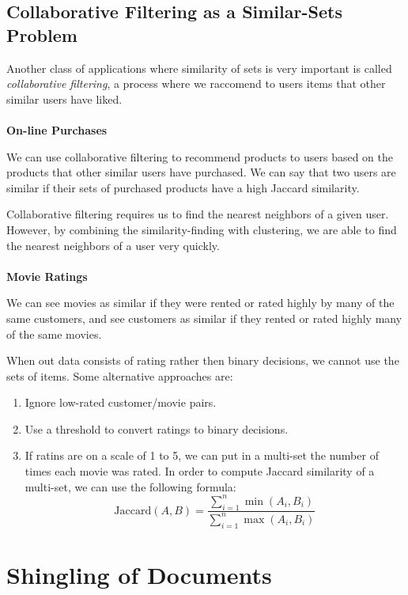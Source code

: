 \subsection{Collaborative Filtering as a Similar-Sets Problem}\label{subsec:collaborative-filtering-as-a-similar-sets-problem}

Another class of applications where similarity of sets is very important is called \textit{collaborative filtering}, a process where we raccomend to users items that other similar users have liked. 
\\
\\
\noindent \textbf{On-line Purchases} 

\noindent We can use collaborative filtering to recommend products to users based on the products that other similar users have purchased. We can say that two users are similar if their sets of purchased products have a high Jaccard similarity. 

Collaborative filtering requires us to find the nearest neighbors of a given user. However, by combining the similarity-finding with clustering, we are able to find the nearest neighbors of a user very quickly.
\\
\\
\noindent \textbf{Movie Ratings}

\noindent We can see movies as similar if they were rented or rated highly by many of the same customers, and see customers as similar if they rented or rated highly many of the same movies. 

When out data consists of rating rather then binary decisions, we cannot use the sets of items. Some alternative approaches are:

\begin{enumerate}
    \item Ignore low-rated customer/movie pairs.
    \item Use a threshold to convert ratings to binary decisions.
    \item If ratins are on a scale of 1 to 5, we can put in a multi-set the number of times each movie was rated. In order to compute Jaccard similarity of a multi-set, we can use the following formula:
    \begin{equation*}
        \text{Jaccard}(A, B) = \frac{\sum_{i=1}^n \min(A_i, B_i)}{\sum_{i=1}^n \max(A_i, B_i)}
    \end{equation*}
\end{enumerate}


\section{Shingling of Documents}\label{sec:shingling-of-documents}

